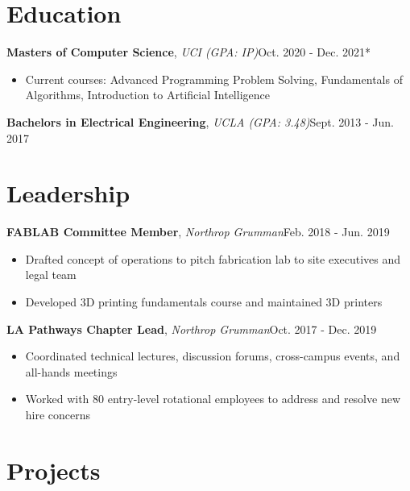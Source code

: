 \documentclass[12pt]{article}
\newcommand\firstboxx[2]{\textbf{\fontsize{12.8}{15}\selectfont #1}, \textit{#2}}
\newcommand{\itemheader}[3]{\firstboxx{#1}{#2}\hfill#3}
\begin{document}
\section*{Education}
\vspace*{-1em}\makebox[\linewidth]{\rule{\textwidth}{0.4pt}}
\itemheader{Masters of Computer Science}{UCI (GPA: IP)}{Oct. 2020 - Dec. 2021*}
\begin{itemize}
\item Current courses: Advanced Programming Problem Solving, Fundamentals of Algorithms, Introduction to Artificial Intelligence
\end{itemize}

\bigskip
\itemheader{Bachelors in Electrical Engineering}{UCLA (GPA: 3.48)}{Sept. 2013 - Jun. 2017}


\section*{Leadership}
\vspace*{-1em}\makebox[\linewidth]{\rule{\textwidth}{0.4pt}}

\itemheader{FABLAB Committee Member}{Northrop Grumman}{Feb. 2018 - Jun. 2019}
\begin{itemize}
\item Drafted concept of operations to pitch fabrication lab to site executives and legal team
\item Developed 3D printing fundamentals course and maintained 3D printers
\end{itemize}

\bigskip
\itemheader{LA Pathways Chapter Lead}{Northrop Grumman}{Oct. 2017 - Dec. 2019}
\begin{itemize}
\item Coordinated technical lectures, discussion forums, cross-campus events, and all-hands meetings
\item Worked with 80 entry-level rotational employees to address and resolve new hire concerns
\end{itemize}

\section*{Projects}
\vspace*{-1em}\makebox[\linewidth]{\rule{\textwidth}{0.4pt}}
\end{document}
